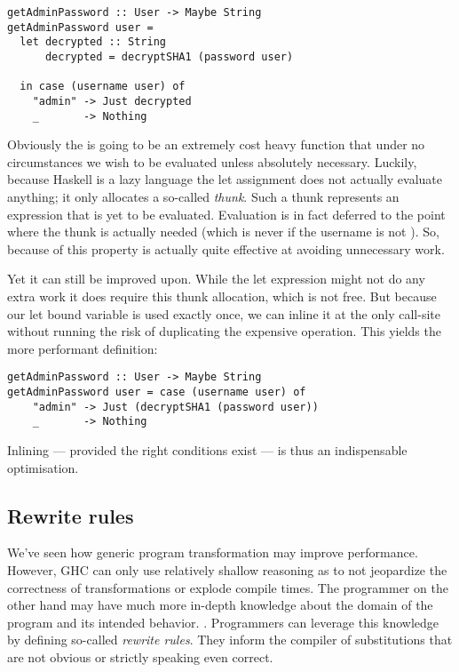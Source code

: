 \begin{listing}[H]
\begin{verbatim}
getAdminPassword :: User -> Maybe String
getAdminPassword user = 
  let decrypted :: String
      decrypted = decryptSHA1 (password user)

  in case (username user) of
    "admin" -> Just decrypted
    _       -> Nothing
\end{verbatim}
\end{listing}

Obviously the  is going to be an extremely cost heavy function that under no
circumstances we wish to be evaluated unless absolutely necessary. Luckily, because Haskell is a
lazy language the let assignment does not actually evaluate anything; it only allocates a so-called
\textit{thunk}. Such a thunk represents an expression that is yet to be evaluated. Evaluation is
in fact deferred to the point where the thunk is actually needed (which is never if the username is
not ). So, because of this property  is actually quite effective 
at avoiding unnecessary work. 

Yet it can still be improved upon. While the let expression might not do any extra work it does require
this thunk allocation, which is not free. But because our let bound variable  
is used exactly once, we can inline it at the only call-site without running the risk of duplicating 
the expensive operation. This yields the more performant definition:

\begin{listing}[H]
\begin{verbatim}
getAdminPassword :: User -> Maybe String
getAdminPassword user = case (username user) of
    "admin" -> Just (decryptSHA1 (password user))
    _       -> Nothing
\end{verbatim}
\end{listing}

Inlining --- provided the right conditions exist --- is thus an indispensable optimisation.

\subsection{Rewrite rules}

We've seen how generic program transformation may improve performance. However, GHC can only use relatively
shallow reasoning as to not jeopardize the correctness of transformations or explode compile times. 
The programmer on the other hand may have much more in-depth knowledge about the domain of the program 
and its intended behavior. \cite{playing_by_the_rules}.
Programmers can leverage this knowledge by defining so-called \textit{rewrite rules}. They inform the compiler of
substitutions that are not obvious or strictly speaking even correct.  

